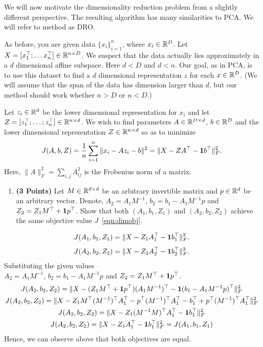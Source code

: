 We will now motivate the dimensionality reduction problem from a slightly different
perspective. The resulting algorithm has many similarities to PCA.
We will refer to method as DRO.

As before, you are given data $\{x_i\}_{i=1}^n$, where $x_i \in \mathbb{R}^D$. Let $X=[x_1^\top; \dots
x_n^\top] \in \mathbb{R}^{n\times D}$. We suspect that the data
actually lies approximately in  a $d$ dimensional affine subspace.
Here $d<D$ and $d<n$.
Our goal, as in PCA, is to use this dataset to find a $d$ dimensional representation $z$ for each $x\in\mathbb{R}^D$.
(We will assume that the span of the data has dimension larger than
$d$, but our method should work whether $n>D$ or $n<D$.)


Let $z_i\in \mathbb{R}^d$ be the lower dimensional representation for $x_i$ and
let $Z = [z_1^\top; \dots; z_n^\top] \in \mathbb{R}^{n\times d}$.
We wish to find parameters $A \in \mathbb{R}^{D\times d}$, $b\in\mathbb{R}^D$ and the lower
dimensional representation $Z\in \mathbb{R}^{n\times d}$ so as to minimize 
\begin{equation}
J(A,b,Z) = \frac{1}{n} \sum_{i=1}^n \|x_i - Az_i - b\|^2 = \| X - ZA^\top - {\bf 1} b^\top\|_F^2.
\label{eqn:dimobj}
\end{equation}
Here, $\|A\|^2_F = \sum_{i,j} A_{ij}^2$ is the Frobenius norm of a matrix.


\begin{enumerate}
\item \textbf{(3 Points)}
Let $M\in\mathbb{R}^{d\times d}$ be an arbitrary invertible matrix and $p\in\mathbb{R}^{d}$ be an arbitrary vector.
Denote, $A_2 = A_1M^{-1}$, $b_2 = b_1- A_1M^{-1}p$ and $Z_2 = Z_1 M^\top +
{\bf 1} p^\top$.
Show that both
$(A_1, b_1, Z_1)$ and $(A_2, b_2, Z_2)$ achieve the same objective value $J$~\eqref{eqn:dimobj}.
\end{enumerate}

\begin{soln}
    \begin{gather*}
        J(A_1,b_1,Z_1) = \| X - Z_1A_1^\top - {\bf 1} b_1^\top\|_F^2.
    \end{gather*}
    \begin{gather*}
        J(A_2,b_2,Z_2) = \| X - Z_2A_2^\top - {\bf 1} b_2^\top\|_F^2.
    \end{gather*}
    Substituting the given values\\
    $A_2 = A_1M^{-1}$, $b_2 = b_1- A_1M^{-1}p$ and $Z_2 = Z_1 M^\top + {\bf 1} p^\top$. \\
    \begin{gather*}
        J(A_2,b_2,Z_2) = \| X - (Z_1 M^\top + {\bf 1} p^\top)(A_1M^{-1})^\top - {\bf 1} (b_1 -A_1M^{-1}p)^\top\|_F^2\\       
        J(A_2,b_2,Z_2) = \| X - Z_1 M^\top (M^{-1})^\top A_1^\top - p^\top (M^{-1})^\top A_1^{\top} - b_1^\top +p^\top (M^{-1})^\top A_1^\top\|_F^2\\         
        J(A_2,b_2,Z_2) = \| X - Z_1 (M^{-1} M)^\top A_1^\top  - {\bf 1} b_1^\top \|_F^2\\
        J(A_2,b_2,Z_2) = \| X - Z_1  A_1^\top - {\bf 1} b_1^\top\|_F^2 = J(A_1,b_1,Z_1)\\
    \end{gather*}
Hence, we can observe above that both objectives are equal.
\end{soln}

